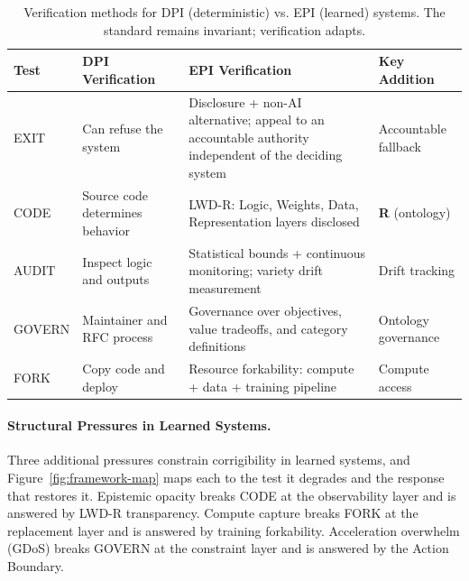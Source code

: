 \documentclass{article}
\theoremstyle{definition}
\begin{document}
\begin{table}[htbp]
\centering
\small
\begin{tabular}{@{}lp{3.5cm}p{4.5cm}p{3cm}@{}}
\toprule
\textbf{Test} & \textbf{DPI Verification} & \textbf{EPI Verification} & \textbf{Key Addition} \\
\midrule
EXIT & Can refuse the system & Disclosure + non-AI alternative; appeal to an accountable authority independent of the deciding system & Accountable fallback \\
CODE & Source code determines behavior & LWD-R: Logic, Weights, Data, Representation layers disclosed & \textbf{R} (ontology) \\
AUDIT & Inspect logic and outputs & Statistical bounds + continuous monitoring; variety drift measurement & Drift tracking \\
GOVERN & Maintainer and RFC process & Governance over objectives, value tradeoffs, and category definitions & Ontology governance \\
FORK & Copy code and deploy & Resource forkability: compute + data + training pipeline & Compute access \\
\bottomrule
\end{tabular}
\caption{Verification methods for DPI (deterministic) vs. EPI (learned) systems. The standard remains invariant; verification adapts.}
\label{tab:verification}
\end{table}

\paragraph{Structural Pressures in Learned Systems.} Three additional pressures constrain corrigibility in learned systems, and Figure~\ref{fig:framework-map} maps each to the test it degrades and the response that restores it. Epistemic opacity breaks CODE at the observability layer and is answered by LWD-R transparency. Compute capture breaks FORK at the replacement layer and is answered by training forkability. Acceleration overwhelm (GDoS) breaks GOVERN at the constraint layer and is answered by the Action Boundary.
\end{document}
